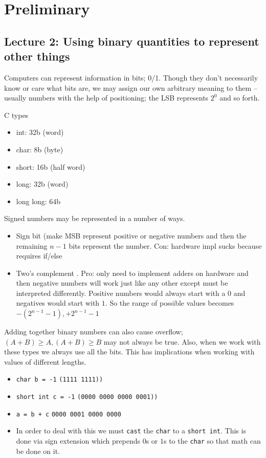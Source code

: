 \documentclass[10pt]{article}
\begin{document}
\section{Preliminary}
\subsection{Lecture 2: Using binary quantities to represent other things}

Computers can represent information in bits; 0/1. 
Though they don't necessarily know or care what bits are, we may assign our own arbitrary meaning to them -- usually numbers with the help of positioning; the LSB represents $ 2^0 $ and so forth.

C types 
	\begin{itemize}
		\item int: 32b (word)
		\item char: 8b (byte)
		\item short: 16b (half word)
		\item long: 32b (word)
		\item long long: 64b
	\end{itemize}

Signed numbers may be represented in a number of ways.
\begin{itemize}
	\item Sign bit (make MSB represent positive or negative numbers and then the remaining $ n-1 $ bits represent the number. Con: hardware impl sucks because requires if/else
	\item Two's complement . Pro: only need to implement adders on hardware and then negative numbers will work just like any other except must be interpreted differently. Positive numbers would always start with a $ 0 $ and negatives would start with $ 1 $. So the range of possible values becomes $ -(2^{n-1}-1), +2^{n-1}-1$ 
\end{itemize}

Adding together binary numbers can also cause overflow; $ (A+B) \ge A, (A+B) \ge  B $ may not always be true.
Also, when we work with these types we always use all the bits. This has implications when working with values of different lengths.

\begin{itemize}
	\item \texttt{char b = -1}  \texttt{(1111 1111))}
	\item \texttt{short int c = -1}  \texttt{(0000 0000 0000 0001))}
	\item \texttt{a = b + c} \texttt{0000 0001 0000 0000 } 
	\item In order to deal with this we must \texttt{cast} the \texttt{char} to a \texttt{short int}. This is done via sign extension which prepends $ 0 $s or $ 1 $s  to the \texttt{char} so that math can be done on it.
\end{itemize}
\end{document}
